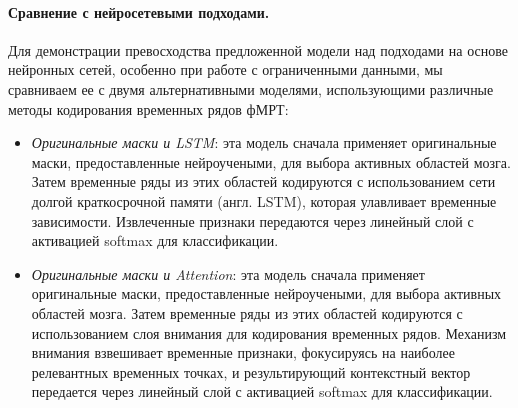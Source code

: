 \begin{table}[h!]
    \centering
    \caption{Анализ методом исключения компонент влияния отдельных компонентов модели на качество классификации. Метрики на тестовых выборках усреднены по испытуемым. Статистическая значимость обозначена звездочками: *$p\text{-value} < .05$, **$p\text{-value} < .005$, отражающими значимость улучшений относительно полной модели. Доверительные интервалы (англ. CI) представляют диапазон, в котором, вероятно, находятся истинные значения метрик с 95\% доверительной вероятностью.}\label{table:ablation}
\end{table}

\paragraph{Сравнение с нейросетевыми подходами.}
Для демонстрации превосходства предложенной модели над подходами на основе нейронных сетей, особенно при работе с ограниченными данными, мы сравниваем ее с двумя альтернативными моделями, использующими различные методы кодирования временных рядов фМРТ:
\begin{itemize}
    \item \textit{Оригинальные маски и LSTM}: эта модель сначала применяет оригинальные маски, предоставленные нейроучеными, для выбора активных областей мозга. Затем временные ряды из этих областей кодируются с использованием сети долгой краткосрочной памяти (англ. LSTM), которая улавливает временные зависимости. Извлеченные признаки передаются через линейный слой с активацией softmax для классификации.
    \item \textit{Оригинальные маски и Attention}: эта модель сначала применяет оригинальные маски, предоставленные нейроучеными, для выбора активных областей мозга. Затем временные ряды из этих областей кодируются с использованием слоя внимания для кодирования временных рядов. Механизм внимания взвешивает временные признаки, фокусируясь на наиболее релевантных временных точках, и результирующий контекстный вектор передается через линейный слой с активацией softmax для классификации.
\end{itemize}

